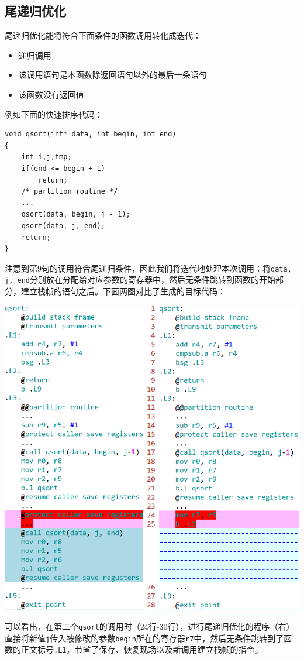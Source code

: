 \subsection{尾递归优化}
\label{tailrecursion}
尾递归优化能将符合下面条件的函数调用转化成迭代：
\begin{itemize}
	\item 递归调用
	\item 该调用语句是本函数除返回语句以外的最后一条语句
	\item 该函数没有返回值
\end{itemize}
例如下面的快速排序代码：
\begin{lstlisting}
void qsort(int* data, int begin, int end)
{
	int i,j,tmp;
	if(end <= begin + 1)
		return;
	/* partition routine */
	...
	qsort(data, begin, j - 1);
	qsort(data, j, end);
	return;
}
\end{lstlisting}
注意到第9句的调用符合尾递归条件，因此我们将迭代地处理本次调用：将\verb|data, j, end|分别放在分配给对应参数的寄存器中，然后无条件跳转到函数的开始部分，建立栈帧的语句之后。下面两图对比了生成的目标代码：
\begin{center}
	\includegraphics[scale=0.44]{tail_recursion.png}
	\label{fig:tailrecursion}
\end{center}
可以看出，在第二个\verb|qsort|的调用时（24行-30行），进行尾递归优化的程序（右）直接将新值\verb|j|传入被修改的参数\verb|begin|所在的寄存器\verb|r7|中，然后无条件跳转到了函数的正文标号\verb|.L1|。节省了保存、恢复现场以及新调用建立栈帧的指令。\\
